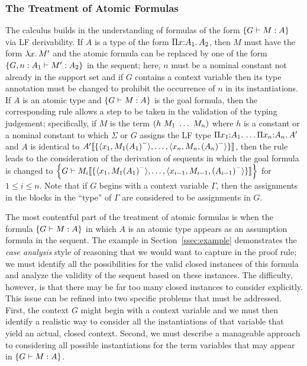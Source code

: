 \subsubsection{The Treatment of Atomic Formulas}

The calculus builds in the understanding of formulas of the form
$\fatm{G}{M : A}$ via LF derivability.
%
If $A$ is a type of the form $\typedpi{x}{A_1}{A_2}$, then $M$ must
have the form $\lflam{x}{M'}$ and the atomic formula can be replaced
by one of the form $\fatm{G,n:A_1}{M':A_2}$ in the sequent; here, $n$
must be a nominal constant not already in the support set and if $G$
contains a context variable then its type annotation must be changed
to prohibit the occurrence of $n$ in its instantiations.
%
If $A$ is an atomic type and $\fatm{G}{M : A}$ is the goal formula,
then the corresponding rule allows a step to be taken in the
validation of the typing judgement; specifically, if $M$ is the term
$(h\app M_1\app\ldots\app M_n)$ where $h$ is a constant or a nominal
constant to which $\Sigma$ or $G$ assigns the
LF type $\typedpi{x_1}{A_1}{\ldots\typedpi{x_n}{A_n}{A'}}$ and $A$ is
identical to $\hsubst{\{\langle x_1,M_1\erase{A_1} \rangle,
  \ldots,\langle x_n,M_n,\erase{A_n}\rangle\}}{A'}$, then the rule
leads to the consideration of the derivation of sequents in which
the goal formula is changed to $\fatm{G}{\hsubst{\{\langle x_1,M_1\erase{A_1} \rangle,
  \ldots,\langle x_{i-1},M_{i-1},\erase{A_{i-1}}\rangle\}}{M_i}}$ for
$1 \leq i \leq n$. Note that if $G$ begins with a context variable $\Gamma$,
  then the assignments in the blocks in the ``type'' of $\Gamma$ are
  considered to be assignments in $G$.

The most contentful part of the treatment of atomic formulas
is when the formula $\fatm{G}{M : A}$ in which $A$ is an atomic type
appears as an assumption formula in the sequent. 
%
The example in Section~\ref{ssec:example} demonstrates the
\emph{case analysis} style of reasoning that we would want to capture 
in the proof rule; we must identify all the possibilities for the valid
closed instances of this formula and analyze the validity of the
sequent based on these instances.
%
The difficulty, however, is that there may be far too many closed
instances to consider explicitly.
%
This issue can be refined into two specific problems that must be
addressed. 
%
First, the context $G$ might begin with a context variable and we must
then identify a realistic way to consider all the instantiations of that
variable that yield an actual, closed context.
%
Second, we must describe a manageable approach to considering all
possible instantiations for the term variables that may appear in
$\fatm{G}{M : A}$. 

